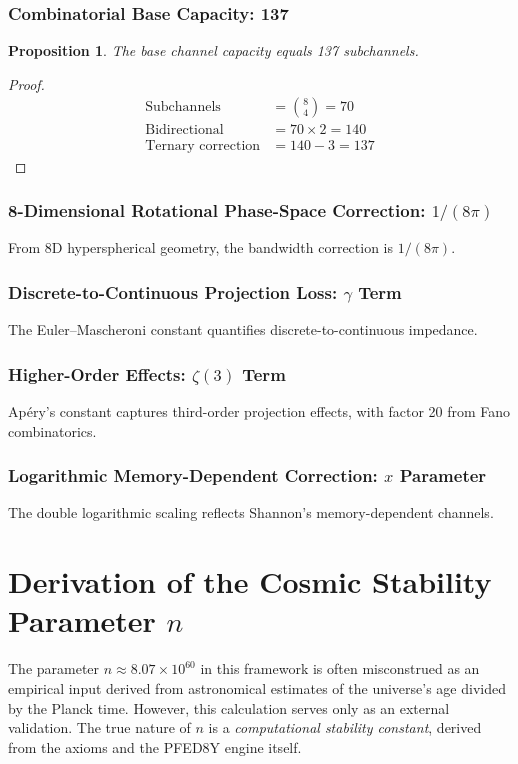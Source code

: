 \documentclass[pdflatex,sn-mathphys-num]{sn-jnl}
\theoremstyle{thmstyleone}
\newtheorem{proposition}[theorem]{Proposition}
\theoremstyle{thmstyletwo}
\theoremstyle{thmstylethree}
\begin{document}
\subsubsection{Combinatorial Base Capacity: 137}

\begin{proposition}
The base channel capacity equals 137 subchannels.
\end{proposition}
\begin{proof}
\begin{align}
\text{Subchannels} &= \binom{8}{4} = 70\\
\text{Bidirectional} &= 70 \times 2 = 140\\
\text{Ternary correction} &= 140 - 3 = 137
\end{align}
\end{proof}


\subsubsection{8-Dimensional Rotational Phase-Space Correction: $1/(8\pi)$}
From 8D hyperspherical geometry, the bandwidth correction is $1/(8\pi)$.
\subsubsection{Discrete-to-Continuous Projection Loss: $\gamma$ Term}
The Euler--Mascheroni constant quantifies discrete-to-continuous impedance.

\subsubsection{Higher-Order Effects: $\zeta(3)$ Term}
Apéry's constant captures third-order projection effects, with factor 20 from Fano combinatorics.

\subsubsection{Logarithmic Memory-Dependent Correction: $x$ Parameter}
The double logarithmic scaling reflects Shannon's memory-dependent channels.

\section{Derivation of the Cosmic Stability Parameter $n$}\label{sec:s1-stability}
The parameter $n \approx 8.07 \times 10^{60}$ in this framework is often misconstrued as an empirical input derived from astronomical estimates of the universe's age divided by the Planck time. However, this calculation serves only as an external validation. The true nature of $n$ is a \textit{computational stability constant}, derived from the axioms and the PFED8Y engine itself.
\end{document}
